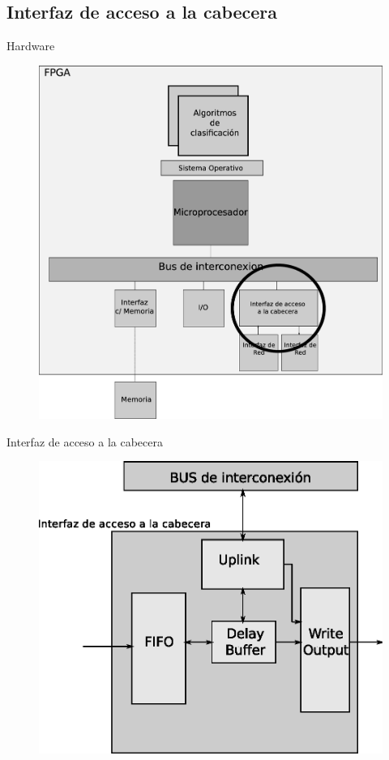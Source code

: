 \documentclass[xcolor=dvipsnames]{beamer}
\begin{document}
\subsection{Interfaz de acceso a la cabecera}
\begin{frame}{Hardware}
   	\begin{figure}
   		\centering
    		\includegraphics[scale=0.17]{figures/solucioninter.eps}
    	\end{figure}
\end{frame}


\begin{frame}{Interfaz de acceso a la cabecera}
\begin{figure}
\centering 
\includegraphics[scale=0.60]{figures/modulo.eps}
\end{figure}
\end{frame}
\end{document}
